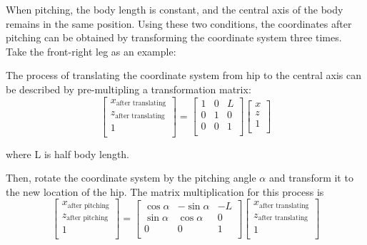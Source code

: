 When pitching, the body length is constant, and the central axis of the body remains in the same position. Using these two conditions, the coordinates after pitching can be obtained by transforming the coordinate system three times. Take the front-right leg as an example:


The process of translating the coordinate system from hip to the central axis can be described by pre-multipling a transformation matrix:
\begin{equation}
   \begin{bmatrix}
   x_\text{after translating} \\
   z_\text{after translating} \\
   1                          \\
   \end{bmatrix}
   =
   \begin{bmatrix}
   1 & 0 & L \\
   0 & 1 & 0 \\
   0 & 0 & 1 \\
   \end{bmatrix}
   \begin{bmatrix}
   x \\
   z \\
   1 \\
   \end{bmatrix}
\end{equation}

where L is half body length.

Then, rotate the coordinate system by the pitching angle $\alpha$ and transform it to the new location of the hip. The matrix multiplication for this process is
\begin{equation}
   \begin{bmatrix}
   x_\text{after pitching} \\
   z_\text{after pitching} \\
   1                       \\
   \end{bmatrix}
   =
   \begin{bmatrix}
   \cos\alpha & -\sin\alpha & -L \\
   \sin\alpha & \cos\alpha & 0 \\
   0 & 0 & 1 \\
   \end{bmatrix}
   \begin{bmatrix}
   x_\text{after translating} \\
   z_\text{after translating} \\
   1                          \\
   \end{bmatrix}
\end{equation}

